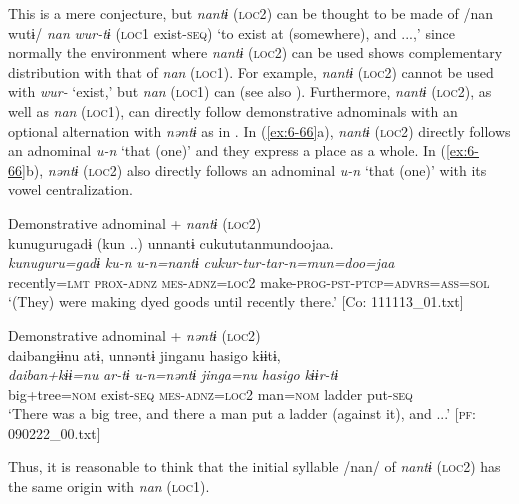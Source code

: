 This is a mere conjecture, but \textit{nantɨ} (\textsc{loc2}) can be thought to be made of /nan wutɨ/ \textit{nan} \textit{wur-tɨ} (\textsc{loc1} exist-\textsc{seq}) ‘to exist at (somewhere), and ...,’ since normally the environment where \textit{nantɨ} (\textsc{loc2}) can be used shows complementary distribution with that of \textit{nan} (\textsc{loc1}). For example, \textit{nantɨ} (\textsc{loc2}) cannot be used with \textit{wur-} ‘exist,’ but \textit{nan} (\textsc{loc1}) can (see also ). Furthermore, \textit{nantɨ} (\textsc{loc2}), as well as \textit{nan} (\textsc{loc1}), can directly follow demonstrative adnominals with an optional alternation with \textit{nəntɨ} as in . In (\ref{ex:6-66}a), \textit{nantɨ} (\textsc{loc2}) directly follows an adnominal \textit{u-n} ‘that (one)’ and they express a place as a whole. In (\ref{ex:6-66}b), \textit{nəntɨ} (\textsc{loc2}) also directly follows an adnominal \textit{u-n} ‘that (one)’ with its vowel centralization.

\ea\label{ex:6-66}
\ea Demonstrative adnominal + \textit{nantɨ} (\textsc{loc2})\\
{\TM}
\glll  kunugurugadɨ  (kun ..)  unnantɨ cukututanmundoojaa.\\
\textit{kunuguru=gadɨ}  \textit{ku-n}  \textit{u-n=nantɨ}   \textit{cukur-tur-tar-n=mun=doo=jaa}\\
recently=\textsc{lmt}  \textsc{prox}-\textsc{adnz}  \textsc{mes}-\textsc{adnz}=\textsc{loc2}   make-\textsc{prog}-\textsc{pst}-\textsc{ptcp}=\textsc{advrs}=\textsc{ass}=\textsc{sol}\\
\glt ‘(They) were making dyed goods until recently there.’ [Co: 111113\_01.txt]
\z

\ex Demonstrative adnominal + \textit{nəntɨ} (\textsc{loc2})\\
{\TM}
\glll  daibangɨɨnu  atɨ,  unnəntɨ  jinganu  {\textbar}hasigo{\textbar}  kɨɨtɨ,\\
\textit{daiban+kɨɨ=nu}  \textit{ar-tɨ}  \textit{u-n=nəntɨ}  \textit{jinga=nu}  \textit{hasigo}  \textit{kɨɨr-tɨ}\\
big+tree=\textsc{nom}  exist-\textsc{seq}  \textsc{mes}-\textsc{adnz}=\textsc{loc2}  man=\textsc{nom}  ladder  put-\textsc{seq}\\
\glt ‘There was a big tree, and there a man put a ladder (against it), and ...’ [\textsc{pf}: 090222\_00.txt]
\z

Thus, it is reasonable to think that the initial syllable /nan/ of \textit{nantɨ} (\textsc{loc2}) has the same origin with \textit{nan} (\textsc{loc1}).

